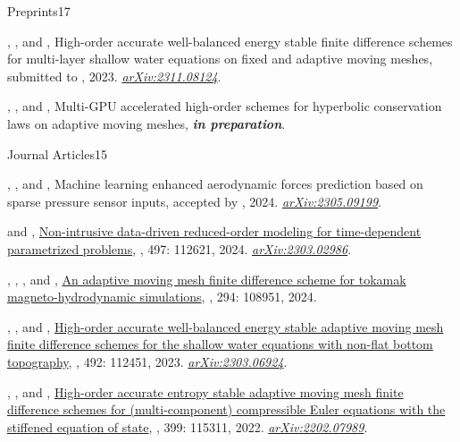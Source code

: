 %
\begin{cvpublicationsection}{Preprints}{17}
%
\item {}, , and , High-order accurate well-balanced energy stable finite difference schemes for multi-layer shallow water equations on fixed and adaptive moving meshes, submitted to , 2023. \href{https://arxiv.org/abs/2311.08124}{\em arXiv:2311.08124}.
%
\item {}, , and , Multi-GPU accelerated high-order schemes for hyperbolic conservation laws on adaptive moving meshes, {\em\bfseries in preparation}.
\end{cvpublicationsection}
\begin{cvpublicationsection}{Journal Articles}{15}
%
\item {}, , and , Machine learning enhanced aerodynamic forces prediction based on sparse pressure sensor inputs, accepted by , 2024. \href{https://arxiv.org/abs/2305.09199}{\em arXiv:2305.09199}.
%
\item {} and , \href{https://doi.org/10.1016/j.jcp.2023.112621}{Non-intrusive data-driven reduced-order modeling for time-dependent parametrized problems}, , 497: 112621, 2024. \href{https://arxiv.org/abs/2303.02986}{\em arXiv:2303.02986}.
%
\item {}, , , and , \href{https://doi.org/10.1016/j.cpc.2023.108951}{An adaptive moving mesh finite difference scheme for tokamak magneto-hydrodynamic simulations}, , 294: 108951, 2024.
%
\item {}, , and , \href{https://doi.org/10.1016/j.jcp.2023.112451}{High-order accurate well-balanced energy stable adaptive moving mesh finite difference schemes for the shallow water equations with non-flat bottom topography}, , 492: 112451, 2023. \href{https://arxiv.org/abs/2303.06924}{\em arXiv:2303.06924}.
%
\item {}, , and , \href{https://doi.org/10.1016/j.cma.2022.115311}{High-order accurate entropy stable adaptive moving mesh finite difference schemes for (multi-component) compressible Euler equations with the stiffened equation of state}, , 399: 115311, 2022. \href{https://arxiv.org/abs/2202.07989}{\em arXiv:2202.07989}.

\end{cvpublicationsection}
